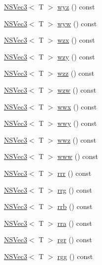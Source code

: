 \begin{DoxyCompactItemize}
\item 
\hyperlink{structNSVec3}{N\-S\-Vec3}$<$ T $>$ \hyperlink{structNSVec4_a5d0604f7906878b4b2641b02b3fae9ce}{wyz} () const 
\item 
\hyperlink{structNSVec3}{N\-S\-Vec3}$<$ T $>$ \hyperlink{structNSVec4_ab620e71cb1227f84b5d42afd78a1de9a}{wyw} () const 
\item 
\hyperlink{structNSVec3}{N\-S\-Vec3}$<$ T $>$ \hyperlink{structNSVec4_a8376cefa70aa75472943d8303be4de87}{wzx} () const 
\item 
\hyperlink{structNSVec3}{N\-S\-Vec3}$<$ T $>$ \hyperlink{structNSVec4_a0c211c191094da347e3797d4bf54c367}{wzy} () const 
\item 
\hyperlink{structNSVec3}{N\-S\-Vec3}$<$ T $>$ \hyperlink{structNSVec4_ad09d9f56ad9ac4ffc1128f5e9e4c9306}{wzz} () const 
\item 
\hyperlink{structNSVec3}{N\-S\-Vec3}$<$ T $>$ \hyperlink{structNSVec4_aed6d28aa9aa01ccb6d859101be6548c2}{wzw} () const 
\item 
\hyperlink{structNSVec3}{N\-S\-Vec3}$<$ T $>$ \hyperlink{structNSVec4_a3beec881b252ba2c9ef8953c77e184ec}{wwx} () const 
\item 
\hyperlink{structNSVec3}{N\-S\-Vec3}$<$ T $>$ \hyperlink{structNSVec4_ae1038690f24badef888463949030a7f6}{wwy} () const 
\item 
\hyperlink{structNSVec3}{N\-S\-Vec3}$<$ T $>$ \hyperlink{structNSVec4_a2e44839c2eace83404e6d6bf284fe642}{wwz} () const 
\item 
\hyperlink{structNSVec3}{N\-S\-Vec3}$<$ T $>$ \hyperlink{structNSVec4_ac644aa7becc8da937351cbc263d1f3e4}{www} () const 
\item 
\hyperlink{structNSVec3}{N\-S\-Vec3}$<$ T $>$ \hyperlink{structNSVec4_a9409bea6361169f857b8700842efc2f1}{rrr} () const 
\item 
\hyperlink{structNSVec3}{N\-S\-Vec3}$<$ T $>$ \hyperlink{structNSVec4_a1608af117ab733a3711a02dbe07737b7}{rrg} () const 
\item 
\hyperlink{structNSVec3}{N\-S\-Vec3}$<$ T $>$ \hyperlink{structNSVec4_aa6cc125b7becfec656e333a97025f4db}{rrb} () const 
\item 
\hyperlink{structNSVec3}{N\-S\-Vec3}$<$ T $>$ \hyperlink{structNSVec4_a794f25886f5907fd14b9a03f70424ce2}{rra} () const 
\item 
\hyperlink{structNSVec3}{N\-S\-Vec3}$<$ T $>$ \hyperlink{structNSVec4_a4aa0f015f974b22be44defe6a1eabae6}{rgr} () const 
\item 
\hyperlink{structNSVec3}{N\-S\-Vec3}$<$ T $>$ \hyperlink{structNSVec4_ab69ef51d688bd6e4b73e7fc0e1933be9}{rgg} () const 

\end{DoxyCompactItemize}
